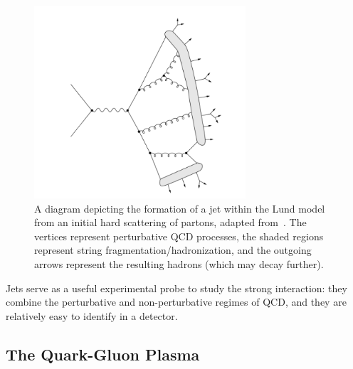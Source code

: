 \begin{figure}[ht]
    \centering
    \includegraphics[width=0.7\textwidth]{figures/introduction/jet_string.png}
    \caption{A diagram depicting the formation of a jet within the Lund model from an initial hard scattering of partons, adapted from~\cite{JetStringDiagram}. The vertices represent perturbative QCD processes, the shaded regions represent string fragmentation/hadronization, and the outgoing arrows represent the resulting hadrons (which may decay further).}
    \label{fig:jet_diagram}
\end{figure}

Jets serve as a useful experimental probe to study the strong interaction: they combine the perturbative and non-perturbative regimes of QCD, and they are relatively easy to identify in a detector.

\subsection{The Quark-Gluon Plasma}